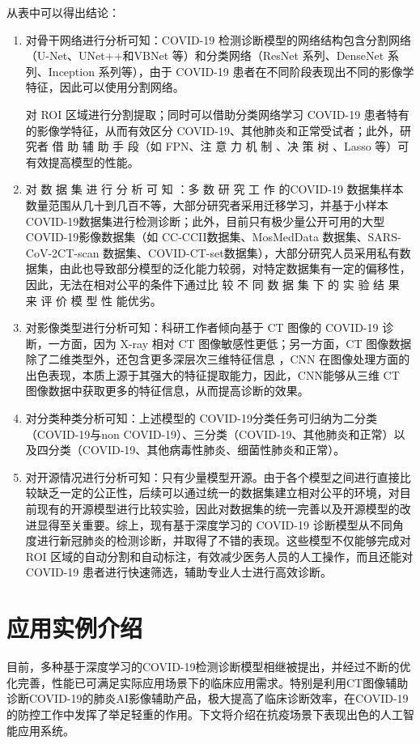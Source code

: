 \documentclass[journal,twoside,web]{ieeecolor}
\begin{document}
从表中可以得出结论：
\begin{enumerate}
\item 对骨干网络进行分析可知：COVID-19 检测诊断模型的网络结构包含分割网络（U-Net、UNet++和VBNet 等）和分类网络（ResNet 系列、DenseNet 系列、Inception 系列等），由于 COVID-19 患者在不同阶段表现出不同的影像学特征，因此可以使用分割网络。

对 ROI 区域进行分割提取；同时可以借助分类网络学习 COVID-19 患者特有的影像学特征，从而有效区分 COVID-19、其他肺炎和正常受试者；此外，研究者 借 助 辅 助 手 段（如 FPN、注 意 力 机 制 、决 策 树 、Lasso 等）可有效提高模型的性能。
\item 对 数 据 集 进 行 分 析 可 知 ：多 数 研 究 工 作 的COVID-19 数据集样本数量范围从几十到几百不等，大部分研究者采用迁移学习，并基于小样本COVID-19数据集进行检测诊断；此外，目前只有极少量公开可用的大型 COVID-19影像数据集（如 CC-CCII数据集、MosMedData 数据集、SARS-CoV-2CT-scan 数据集、COVID-CT-set数据集），大部分研究人员采用私有数据集，由此也导致部分模型的泛化能力较弱，对特定数据集有一定的偏移性，因此，无法在相对公平的条件下通过比 较 不 同 数 据 集 下 的 实 验 结 果 来 评 价 模 型 性 能优劣。
\item 对影像类型进行分析可知：科研工作者倾向基于 CT 图像的 COVID-19 诊断，一方面，因为 X-ray 相对 CT 图像敏感性更低；另一方面，CT 图像数据除了二维类型外，还包含更多深层次三维特征信息 ，CNN 在图像处理方面的出色表现，本质上源于其强大的特征提取能力，因此，CNN能够从三维 CT 图像数据中获取更多的特征信息，从而提高诊断的效果。
\item 对分类种类分析可知：上述模型的 COVID-19分类任务可归纳为二分类（COVID-19与non COVID-19）、三分类（COVID-19、其他肺炎和正常）以及四分类（COVID-19、其他病毒性肺炎、细菌性肺炎和正常）。
\item 对开源情况进行分析可知：只有少量模型开源。由于各个模型之间进行直接比较缺乏一定的公正性，后续可以通过统一的数据集建立相对公平的环境，对目前现有的开源模型进行比较实验，因此对数据集的统一完善以及开源模型的改进显得至关重要。综上，现有基于深度学习的 COVID-19 诊断模型从不同角度进行新冠肺炎的检测诊断，并取得了不错的表现。这些模型不仅能够完成对 ROI 区域的自动分割和自动标注，有效减少医务人员的人工操作，而且还能对 COVID-19 患者进行快速筛选，辅助专业人士进行高效诊断。
\end{enumerate}
\section{应用实例介绍}
目前，多种基于深度学习的COVID-19检测诊断模型相继被提出，并经过不断的优化完善，性能已可满足实际应用场景下的临床应用需求。特别是利用CT图像辅助诊断COVID-19的肺炎AI影像辅助产品，极大提高了临床诊断效率，在COVID-19的防控工作中发挥了举足轻重的作用。下文将介绍在抗疫场景下表现出色的人工智能应用系统。
\end{document}
